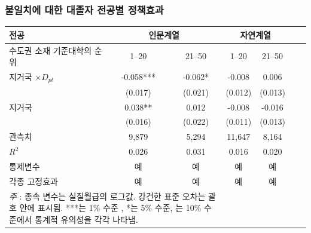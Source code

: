 \documentclass[aspectratio=169,xcolor=dvipsnames,handout]{beamer}
\begin{document}
\begin{frame}
    \frametitle{불일치에 대한 대졸자 전공별 정책효과}
    \begin{table}[ht]
        \tiny
        \centering
        \begin{tabular}{lcccccc}
        \toprule
        \textbf{전공} & \multicolumn{2}{c}{\textbf{인문계열}}& \multicolumn{2}{c}{\textbf{자연계열}} \\
        \midrule                                                                                  
        수도권 소재 기준대학의 순위    & 1--20     & 21--50    & 1--20     & 21--50    \\
        \midrule                                                          
        지거국 $\times D_{pt}$                         & -0.058***  & -0.062*    & -0.008  & 0.006 \\
                                                     & (0.017)   & (0.021)   & (0.012)   & (0.013)   \\
        지거국                                         & 0.038** & 0.012 & -0.008 & -0.016 \\
                                                     & (0.016)   & (0.022)   & (0.011)   & (0.013)   \\
        \midrule                                                          
        관측치                                 & 9,879    & 5,294    & 11,647    & 8,164    \\
        $R^2$                                    & 0.026     & 0.031     & 0.016     & 0.020     \\
        통제변수                                     & 예       & 예       & 예       & 예       \\
        각종 고정효과                                          & 예       & 예       & 예       & 예       \\
        \bottomrule
        \multicolumn{3}{p{6cm}}{\tiny\textit{주} : 종속 변수는 실질월급의 로그값. 강건한 표준 오차는 괄호 안에 표시됨. ***는 1\% 수준 , *는 5\% 수준, 는 10\% 수준에서 통계적 유의성을 각각 나타냄.} \\
        \end{tabular}
    \end{table}
\end{frame}
\end{document}
